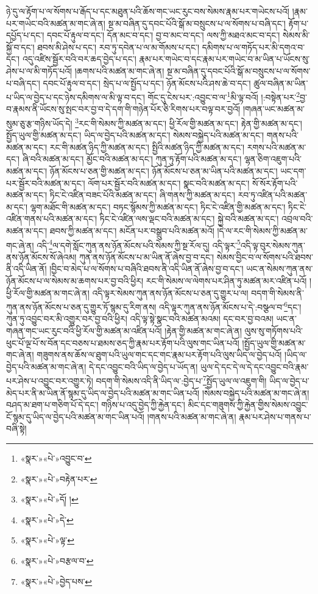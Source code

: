 ཉེ་དུ་ལ་རྟོག་པ་ལ་སོགས་པ་རྒོད་པ་དང་མཐུན་པའི་ཆོས་གང་ཡང་རུང་བས་སེམས་རྣམ་པར་གཡེངས་པའོ། །རྣམ་པར་གཡེང་བའི་མཚན་མ་གང་ཞེ་ན། སྔ་མ་བཞིན་དུ་དབང་པོའི་སྒོ་མ་བསྲུངས་པ་ལ་སོགས་པ་བཞི་དང་། རྟོག་པ་དཔྱོད་པ་དང་། དབང་པོ་རྟུལ་བ་དང་། དོན་མང་བ་དང་། བྱ་བ་མང་བ་དང་། ལས་ཀྱི་མཐའ་མང་བ་དང་། སེམས་མི་སྐྱོ་བ་དང་། ཐབས་མི་ཤེས་པ་དང་། རབ་ཏུ་དབེན་པ་ལ་མ་གོམས་པ་དང་། དམིགས་པ་ལ་གཏོད་པར་མི་དགའ་བ་དང་། འདུ་འཛིས་སྦྱོར་བའི་བར་ཆད་བྱེད་པ་དང་། རྣམ་པར་གཡེང་བ་དང་རྣམ་པར་གཡེང་བ་མ་ཡིན་པ་ཡོངས་སུ་ཤེས་པ་ལ་མི་གཏོད་པའོ། །ཆགས་པའི་མཚན་མ་གང་ཞེ་ན། སྔ་མ་བཞིན་དུ་དབང་པོའི་སྒོ་མ་བསྲུངས་པ་ལ་སོགས་པ་བཞི་དང་། དབང་པོ་རྟུལ་བ་དང་། སྲེད་པ་ལ་སྤྱོད་པ་དང་། ཉོན་མོངས་པའི་ཤས་ཆེ་བ་དང་། ཚུལ་བཞིན་མ་ཡིན་པ་ཡིད་ལ་བྱེད་པ་དང་ཉེས་དམིགས་ལ་མི་ལྟ་བ་དང་། གོང་དུ་ངེས་པར་:འབྱུང་བ་ལ་\footnote{«སྣར་»«པེ་»འབྱུང་བ་}མི་ལྟ་བའོ། །:བསྟེན་པར་\footnote{«སྣར་»«པེ་»བརྟེན་པར་}བྱ་བ་རྣམས་ནི་ཡོངས་སུ་སྤང་བར་བྱ་བ་དེ་དག་གི་གཉེན་པོར་ཅི་རིགས་པར་བལྟ་བར་བྱའོ། །གཞན་ཡང་མཚན་མ་སུམ་ཅུ་རྩ་གཉིས་ཡོད་དེ། \footnote{«སྣར་»«པེ་»དོ། ། }རང་གི་སེམས་ཀྱི་མཚན་མ་དང་། ཕྱི་རོལ་གྱི་མཚན་མ་དང་། རྟེན་གྱི་མཚན་མ་དང་། སྤྱོད་ཡུལ་གྱི་མཚན་མ་དང་། ཡིད་ལ་བྱེད་པའི་མཚན་མ་དང་། སེམས་བསྐྱེད་པའི་མཚན་མ་དང་། གནས་པའི་མཚན་མ་དང་། རང་གི་མཚན་ཉིད་ཀྱི་མཚན་མ་དང་། སྤྱིའི་མཚན་ཉིད་ཀྱི་མཚན་མ་དང་། རགས་པའི་མཚན་མ་དང་། ཞི་བའི་མཚན་མ་དང་། མྱོང་བའི་མཚན་མ་དང་། ཀུན་ཏུ་རྟོག་པའི་མཚན་མ་དང་། ལྷན་ཅིག་འཇུག་པའི་མཚན་མ་དང་། ཉོན་མོངས་པ་ཅན་གྱི་མཚན་མ་དང་། ཉོན་མོངས་པ་ཅན་མ་ཡིན་པའི་མཚན་མ་དང་། ཡང་དག་པར་སྦྱོར་བའི་མཚན་མ་དང་། ལོག་པར་སྦྱོར་བའི་མཚན་མ་དང་། སྣང་བའི་མཚན་མ་དང་། སོ་སོར་རྟོག་པའི་མཚན་མ་དང་། ཏིང་ངེ་འཛིན་བཟང་པོའི་མཚན་མ་དང་། ཞི་གནས་ཀྱི་མཚན་མ་དང་། རབ་ཏུ་འཛིན་པའི་མཚན་མ་དང་། ལྷག་མཐོང་གི་མཚན་མ་དང་། བཏང་སྙོམས་ཀྱི་མཚན་མ་དང་། ཏིང་ངེ་འཛིན་གྱི་མཚན་མ་དང་། ཏིང་ངེ་འཛིན་གནས་པའི་མཚན་མ་དང་། ཏིང་ངེ་འཛིན་ལས་ལྡང་བའི་མཚན་མ་དང་། སྐྱེ་བའི་མཚན་མ་དང་། འབྲལ་བའི་མཚན་མ་དང་། ཐབས་ཀྱི་མཚན་མ་དང་། མངོན་པར་བསྒྲུབ་པའི་མཚན་མའོ། །དེ་ལ་རང་གི་སེམས་ཀྱི་མཚན་མ་གང་ཞེ་ན། འདི་\footnote{«སྣར་»«པེ་»དེ་}ལ་དགེ་སློང་ཀུན་ནས་ཉོན་མོངས་པའི་སེམས་ཀྱི་སྔ་རོལ་དུ། འདི་ལྟར་\footnote{«སྣར་»«པེ་»ལྟ་}འདི་ལྟ་བུར་སེམས་ཀུན་ནས་ཉོན་མོངས་སོ་ཞེའམ། ཀུན་ནས་ཉོན་མོངས་པ་མ་ཡིན་ནོ་ཞེས་བྱ་བ་དང་། སེམས་བྱིང་བ་ལ་སོགས་པའི་ཐབས་ནི་འདི་ཡིན་ནོ། །བྱིང་བ་མེད་པ་ལ་སོགས་པ་བཞིའི་ཐབས་ནི་འདི་ཡིན་ནོ་ཞེས་བྱ་བ་དང་། ཡང་ན་སེམས་ཀུན་ནས་ཉོན་མོངས་པ་ལ་སེམས་མ་ཆགས་པར་བྱ་བའི་ཕྱིར། རང་གི་སེམས་ལ་ལེགས་པར་ཤིན་ཏུ་མཚན་མར་འཛིན་པའོ། །ཕྱི་རོལ་གྱི་མཚན་མ་གང་ཞེ་ན། འདི་ལྟར་སེམས་ཀུན་ནས་ཉོན་མོངས་པ་ཅན་དུ་གྱུར་པ་ལ། བདག་གི་སེམས་ནི་ཀུན་ནས་ཉོན་མོངས་པ་ཅན་དུ་གྱུར་ཏོ་སྙམ་དུ་རིག་ནས། འདི་ལྟར་ཀུན་ནས་ཉོན་མོངས་པ་དེ་:བསྩལ་བ་\footnote{«སྣར་»«པེ་»བརྩལ་བ་}དང་། ཀུན་ཏུ་འབྱུང་བར་མི་འགྱུར་བར་བྱ་བའི་ཕྱིར། འདི་ལྟ་སྟེ་སྣང་བའི་མཚན་མའམ། དང་བར་བྱ་བའམ། ཡང་ན་གཞན་གང་ཡང་རུང་བའི་ཕྱི་རོལ་གྱི་མཚན་མ་འཛིན་པའོ། །རྟེན་གྱི་མཚན་མ་གང་ཞེ་ན། ལུས་སུ་གཏོགས་པའི་ཕུང་པོ་ལྔ་པོ་ས་བོན་དང་བཅས་པ་ཐམས་ཅད་ཀྱི་རྣམ་པར་རྟོག་པའི་ལུས་གང་ཡིན་པའོ། །སྤྱོད་ཡུལ་གྱི་མཚན་མ་གང་ཞེ་ན། གཟུགས་ནས་ཆོས་ལ་ཐུག་པའི་ཡུལ་གང་དང་གང་རྣམ་པར་རྟོག་པའི་ལུས་ཡིད་ལ་བྱེད་པའོ། །ཡིད་ལ་བྱེད་པའི་མཚན་མ་གང་ཞེ་ན། དེ་དང་འབྱུང་བའི་ཡིད་ལ་བྱེད་པ་ཡོད་ན། ཡུལ་དེ་དང་དེ་ལ་དེ་དང་འབྱུང་བའི་རྣམ་པར་ཤེས་པ་འབྱུང་བར་འགྱུར་ཏེ། བདག་གི་སེམས་འདི་ནི་ཡིད་ལ་:བྱེད་པ་\footnote{«སྣར་»«པེ་»བྱེད་པས་}སྤྱོད་ཡུལ་ལ་འཇུག་གི། ཡིད་ལ་བྱེད་པ་མེད་པར་ནི་མ་ཡིན་ནོ་སྙམ་དུ་ཡིད་ལ་བྱེད་པའི་མཚན་མ་གང་ཡིན་པའོ། །སེམས་བསྐྱེད་པའི་མཚན་མ་གང་ཞེ་ན། བཤད་མ་ཐག་པ་གཅིག་པོ་དེ་དང་། གཉིས་པ་འདུ་བྱེད་ཀྱི་རྐྱེན་དང་། མིང་དང་གཟུགས་ཀྱི་རྐྱེན་གྱིས་སེམས་འབྱུང་ངོ་སྙམ་དུ་ཡིད་ལ་བྱེད་པའི་མཚན་མ་གང་ཡིན་པའོ། །གནས་པའི་མཚན་མ་གང་ཞེ་ན། རྣམ་པར་ཤེས་པ་གནས་པ་བཞི་སྟེ། 